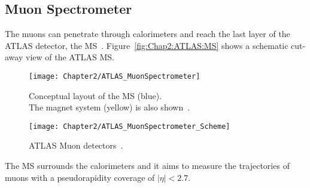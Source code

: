 \subsection{Muon Spectrometer}
\label{sec:Chap2:ATLAS:MS}
The muons can penetrate through calorimeters and reach the last layer of the ATLAS detector, the MS~\cite{ATLAS:1997ad}. %
Figure~\ref{fig:Chap2:ATLAS:MS} shows a schematic cut-away view of the ATLAS MS.

\begin{figure}
\centering
\begin{minipage}{.64\textwidth}
 	\centering
 	 \texttt{[image: Chapter2/ATLAS\_MuonSpectrometer]}
	 \caption{Conceptual layout of the MS (blue). \\The magnet system (yellow) is also shown~\cite{ATLAS:2008xda}.}
	 \label{fig:Chap2:ATLAS:MS}
  \label{fig:test1}
\end{minipage}%
\begin{minipage}{.35\textwidth}
 	\centering
	\texttt{[image: Chapter2/ATLAS\_MuonSpectrometer\_Scheme]}
	\caption{ATLAS Muon detectors~\cite{ATLAS:1997ad}.} 
	\label{fig:Chap2:ATLAS:MS:Scheme}
\end{minipage}
\end{figure}




The MS surrounds the calorimeters and it aims to measure the trajectories of muons 
with a pseudorapidity coverage of $|\eta| < 2.7$.  %


